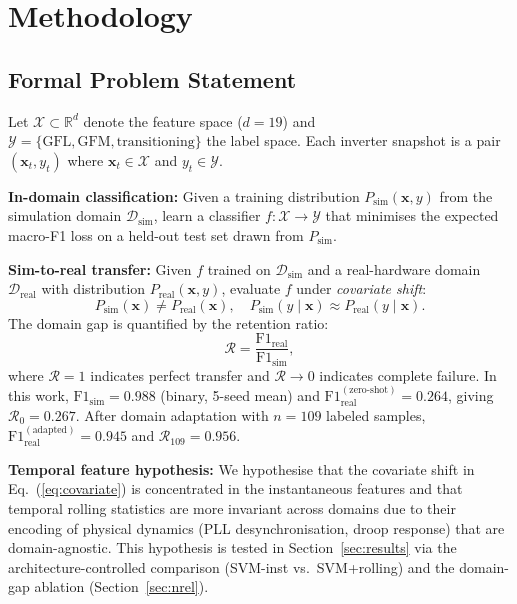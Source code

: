 \documentclass[journal]{IEEEtran}
\newcommand{\gfl}{\text{GFL}}
\newcommand{\gfm}{\text{GFM}}
\begin{document}
\section{Methodology}
\label{sec:methodology}

\subsection{Formal Problem Statement}
\label{sec:formulation}

Let $\mathcal{X} \subset \mathbb{R}^d$ denote the feature space ($d=19$)
and $\mathcal{Y} = \{\gfl, \gfm, \text{transitioning}\}$ the label space.
Each inverter snapshot is a pair $(\mathbf{x}_t, y_t)$ where
$\mathbf{x}_t \in \mathcal{X}$ and $y_t \in \mathcal{Y}$.

\textbf{In-domain classification:}
Given a training distribution $P_\text{sim}(\mathbf{x}, y)$ from the
simulation domain $\mathcal{D}_\text{sim}$, learn a classifier
$f: \mathcal{X} \rightarrow \mathcal{Y}$ that minimises the expected
macro-F1 loss on a held-out test set drawn from $P_\text{sim}$.

\textbf{Sim-to-real transfer:}
Given $f$ trained on $\mathcal{D}_\text{sim}$ and a real-hardware domain
$\mathcal{D}_\text{real}$ with distribution $P_\text{real}(\mathbf{x}, y)$,
evaluate $f$ under \emph{covariate shift}:
\begin{equation}
  P_\text{sim}(\mathbf{x}) \neq P_\text{real}(\mathbf{x}),\quad
  P_\text{sim}(y \mid \mathbf{x}) \approx P_\text{real}(y \mid \mathbf{x}).
  \label{eq:covariate}
\end{equation}
The domain gap is quantified by the retention ratio:
\begin{equation}
  \mathcal{R} = \frac{\text{F1}_\text{real}}{\text{F1}_\text{sim}},
  \label{eq:retention}
\end{equation}
where $\mathcal{R} = 1$ indicates perfect transfer and $\mathcal{R} \rightarrow 0$
indicates complete failure.
In this work, $\text{F1}_\text{sim} = 0.988$ (binary, 5-seed mean) and
$\text{F1}_\text{real}^{(\text{zero-shot})} = 0.264$, giving
$\mathcal{R}_0 = 0.267$.
After domain adaptation with $n = 109$ labeled samples,
$\text{F1}_\text{real}^{(\text{adapted})} = 0.945$ and $\mathcal{R}_{109} = 0.956$.

\textbf{Temporal feature hypothesis:}
We hypothesise that the covariate shift in Eq.~(\ref{eq:covariate}) is
concentrated in the instantaneous features and that temporal rolling statistics
are more invariant across domains due to their encoding of physical dynamics
(PLL desynchronisation, droop response) that are domain-agnostic.
This hypothesis is tested in Section~\ref{sec:results} via the architecture-controlled
comparison (SVM-inst vs.\ SVM+rolling) and the domain-gap ablation (Section~\ref{sec:nrel}).
\end{document}
